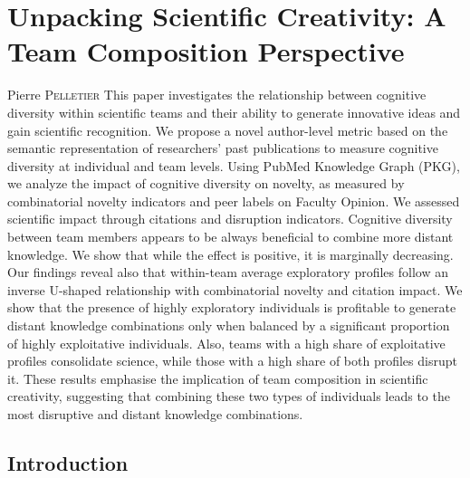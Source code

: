 \chapter{Unpacking Scientific Creativity: A Team Composition Perspective}

\begin{chapabstract}{\small Pierre \textsc{Pelletier}} %
     \small This paper investigates the relationship between cognitive diversity within scientific teams and their ability to generate innovative ideas and gain scientific recognition. We propose a novel author-level metric based on the semantic representation of researchers' past publications to measure cognitive diversity at individual and team levels. Using PubMed Knowledge Graph (PKG), we analyze the impact of cognitive diversity on novelty, as measured by combinatorial novelty indicators and peer labels on Faculty Opinion. We assessed scientific impact through citations and disruption indicators. Cognitive diversity between team members appears to be always beneficial to combine more distant knowledge. We show that while the effect is positive, it is marginally decreasing. Our findings reveal also that within-team average exploratory profiles follow an inverse U-shaped relationship with combinatorial novelty and citation impact. We show that the presence of highly exploratory individuals is profitable to generate distant knowledge combinations only when balanced by a significant proportion of highly exploitative individuals. Also, teams with a high share of exploitative profiles consolidate science, while those with a high share of both profiles disrupt it. These results emphasise the implication of team composition in scientific creativity, suggesting that combining these two types of individuals leads to the most disruptive and distant knowledge combinations. %
\end{chapabstract}


\newpage


\section{Introduction}

